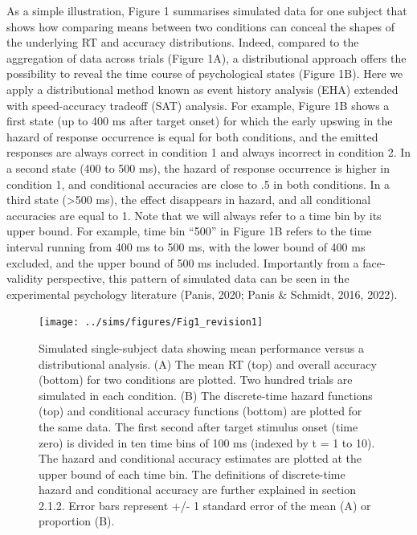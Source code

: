 \documentclass[
  man, donotrepeattitle,floatsintext]{apa6}
\begin{document}
As a simple illustration, Figure 1 summarises simulated data for one subject that shows how comparing means between two conditions can conceal the shapes of the underlying RT and accuracy distributions. Indeed, compared to the aggregation of data across trials (Figure 1A), a distributional approach offers the possibility to reveal the time course of psychological states (Figure 1B). Here we apply a distributional method known as event history analysis (EHA) extended with speed-accuracy tradeoff (SAT) analysis. For example, Figure 1B shows a first state (up to 400 ms after target onset) for which the early upswing in the hazard of response occurrence is equal for both conditions, and the emitted responses are always correct in condition 1 and always incorrect in condition 2. In a second state (400 to 500 ms), the hazard of response occurrence is higher in condition 1, and conditional accuracies are close to .5 in both conditions. In a third state (\textgreater500 ms), the effect disappears in hazard, and all conditional accuracies are equal to 1. Note that we will always refer to a time bin by its upper bound. For example, time bin ``500'' in Figure 1B refers to the time interval running from 400 ms to 500 ms, with the lower bound of 400 ms excluded, and the upper bound of 500 ms included. Importantly from a face-validity perspective, this pattern of simulated data can be seen in the experimental psychology literature (Panis, 2020; Panis \& Schmidt, 2016, 2022).



\begin{figure}[H]

{\centering \texttt{[image: ../sims/figures/Fig1\_revision1]} 

}

\caption{Simulated single-subject data showing mean performance versus a distributional analysis. (A) The mean RT (top) and overall accuracy (bottom) for two conditions are plotted. Two hundred trials are simulated in each condition. (B) The discrete-time hazard functions (top) and conditional accuracy functions (bottom) are plotted for the same data. The first second after target stimulus onset (time zero) is divided in ten time bins of 100 ms (indexed by t = 1 to 10). The hazard and conditional accuracy estimates are plotted at the upper bound of each time bin. The definitions of discrete-time hazard and conditional accuracy are further explained in section 2.1.2. Error bars represent +/- 1 standard error of the mean (A) or proportion (B).}\label{fig:plot1}
\end{figure}
\end{document}
